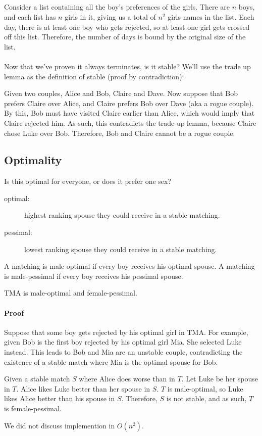 \documentclass[a4paper]{article}
\begin{document}
\subparagraph{}
Consider a list containing all the boy's preferences of the girls. There are $n$ boys, and each list has $n$ girls in it, giving us a total of $n^2$ girls names in the list. Each day, there is at least one boy who gets rejected, so at least one girl gets crossed off this list. Therefore, the number of days is bound by the original size of the list.

\paragraph{}
Now that we've proven it always terminates, is it stable?
We'll use the trade up lemma as the definition of stable (proof by contradiction):

Given two couples, Alice and Bob, Claire and Dave. Now suppose that Bob prefers Claire over Alice, and Claire prefers Bob over Dave (aka a rogue couple). By this, Bob must have visited Claire earlier than Alice, which would imply that Claire rejected him. As such, this contradicts the trade-up lemma, because Claire chose Luke over Bob. Therefore, Bob and Claire cannot be a rogue couple.

\subsection{Optimality}
Is this optimal for everyone, or does it prefer one sex?

\begin{description}
  \item[optimal:] highest ranking spouse they could receive in a stable matching.
  \item[pessimal:] lowest ranking spouse they could receive in a stable matching.
\end{description}

A matching is male-optimal if every boy receives his optimal spouse. A matching is male-pessimal if every boy receives his pessimal spouse. 

TMA is male-optimal and female-pessimal.

\paragraph{Proof}
Suppose that some boy gets rejected by his optimal girl in TMA.
For example, given Bob is the first boy rejected by his optimal girl Mia. She selected Luke instead.
This leads to Bob and Mia are an unstable couple, contradicting the existence of a stable match where Mia is the optimal spouse for Bob.

Given a stable match $S$ where Alice does worse than in $T$.
Let Luke be her spouse in $T$.
Alice likes Luke better than her spouse in $S$.
$T$ is male-optimal, so Luke likes Alice better than his spouse in $S$.
Therefore, $S$ is not stable, and as such, $T$ is female-pessimal.

We did not discuss implemention in $O(n^2)$.
\end{document}
